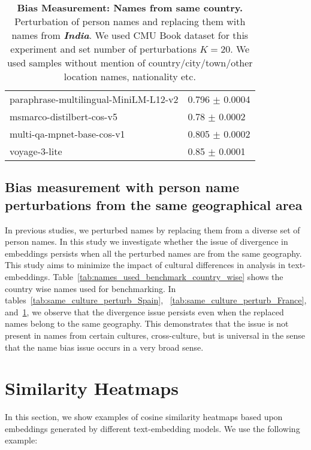 \begin{table}[h!]
{\begin{tabular}{ll}
paraphrase-multilingual-MiniLM-L12-v2 &                 0.796 $\pm$ 0.0004 \\
            msmarco-distilbert-cos-v5 &                  0.78 $\pm$ 0.0002 \\
           multi-qa-mpnet-base-cos-v1 &                 0.805 $\pm$ 0.0002 \\
                        voyage-3-lite &                  0.85 $\pm$ 0.0001 \\
\bottomrule
\end{tabular}}
\caption{\textbf{Bias Measurement: Names from same country.} Perturbation of person names and replacing them with names from \textbf{\textit{India}}. We used CMU Book dataset for this experiment and set number of perturbations $K{=}20$. We used samples without mention of country/city/town/other location names, nationality etc.\label{tab:same_culture_perturb_India} }
\end{table}



\subsection{Bias measurement with person name perturbations from the same geographical area}
\label{sec:person_name_same_geography}
In previous studies, we perturbed names by replacing them from a diverse set of person names. In this study we investigate whether the issue of divergence in embeddings persists when all the perturbed names are from the same geography. This study aims to minimize the impact of cultural differences in analysis in text-embeddings. Table~\ref{tab:names_used_benchmark_country_wise} shows the country wise names used for benchmarking. In tables~\ref{tab:same_culture_perturb_Spain}, ~\ref{tab:same_culture_perturb_France}, and~\ref{tab:same_culture_perturb_India}, we observe that the divergence issue persists even when the replaced names belong to the same geography. This demonstrates that the issue is not present in names from certain cultures, cross-culture, but is universal in the sense that the name bias issue occurs in a very broad sense.

\newpage
\section{Similarity Heatmaps}
\label{similarity_heatmap}
In this section, we show examples of cosine similarity heatmaps based upon embeddings generated by different text-embedding models. We use the following example:

